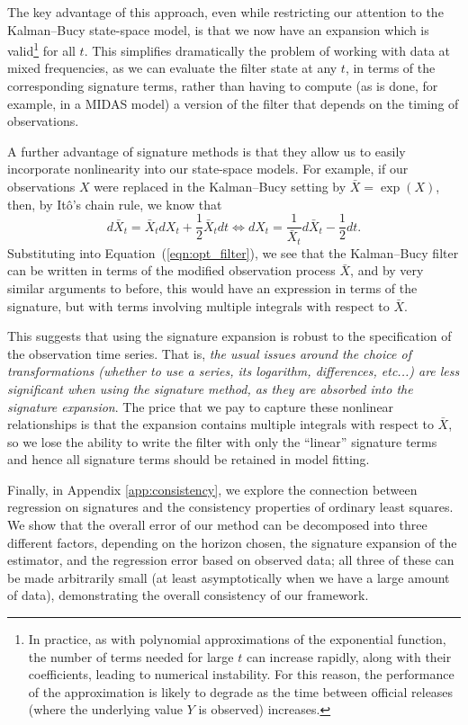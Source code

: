 \documentclass[a4paper, 12pt]{article}
\theoremstyle{remark}
\begin{document}
The key advantage of this approach, even while restricting our attention to the Kalman--Bucy state-space model, is that we now have an expansion which is valid\footnote{In practice, as with polynomial approximations of the exponential function, the number of terms needed for large $t$ can increase rapidly, along with their coefficients, leading to numerical instability. For this reason, the performance of the approximation is likely to degrade as the time between official releases (where the underlying value $Y$ is observed) increases.} for all $t$. This simplifies dramatically the problem of working with data at mixed frequencies, as we can evaluate the filter state at any $t$, in terms of the corresponding signature terms, rather than having to compute (as is done, for example, in a MIDAS model) a version of the filter that depends on the timing of observations.

A further advantage of signature methods is that they allow us to easily incorporate nonlinearity into our state-space models. For example, if our observations $X$ were replaced in the Kalman--Bucy setting by $\bar X = \exp(X)$, then, by It\^{o}'s chain rule, we know that
\[d\bar X_t = \bar{X}_t d X_t + \frac{1}{2} \bar{X}_t dt 
\iff dX_t = \frac{1}{\bar{X}_t}d\bar{X}_t - \frac{1}{2}dt.\]
Substituting into Equation~(\ref{eqn:opt_filter}), we see that the Kalman--Bucy filter can be written in terms of the modified observation process $\bar X$, and by very similar arguments to before, this would have an expression in terms of the signature, but with terms involving multiple integrals with respect to $\bar X$.

This suggests that using the signature expansion is robust to the specification of the observation time series. That is, \textit{the usual issues around the choice of transformations (whether to use a series, its logarithm, differences, etc...) are less significant when using the signature method, as they are absorbed into the signature expansion}. The price that we pay to capture these nonlinear relationships is that the expansion contains multiple integrals with respect to $\bar X$, so we lose the ability to write the filter with only the ``linear'' signature terms and hence all signature terms should be retained in model fitting.

Finally, in Appendix \ref{app:consistency}, we explore the connection between regression on signatures and the consistency properties of ordinary least squares. We show that the overall error of our method can be decomposed into three different factors, depending on the horizon chosen, the signature expansion of the estimator, and the regression error based on observed data; all three of these can be made arbitrarily small (at least asymptotically when we have a large amount of data), demonstrating the overall consistency of our framework.
\end{document}
